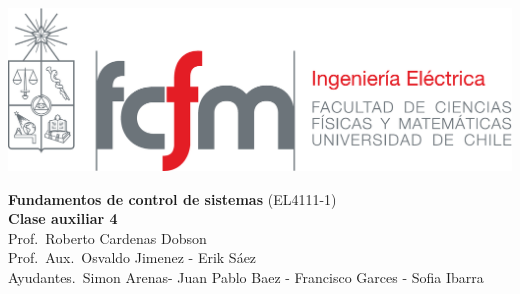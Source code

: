 \documentclass[
  11pt,
  letterpaper,
   addpoints,
   answers
  ]{exam}
\begin{document}
\noindent
\begin{minipage}{0.47\textwidth}
\includegraphics[width=\textwidth]{../fcfm_die}
\end{minipage}
\begin{minipage}{0.53\textwidth}
\begin{center} 
\large\textbf{Fundamentos de control de sistemas} (EL4111-1) \\
\large\textbf{Clase auxiliar 4} \\
\small Prof.~Roberto Cardenas Dobson\\
\small Prof.~Aux.~Osvaldo Jimenez - Erik Sáez\\
\small Ayudantes.~Simon Arenas- Juan Pablo Baez - Francisco Garces - Sofia Ibarra\\
\end{center}
\end{minipage}

\vspace{0.5cm}
\noindent
\vspace{.85cm}
\end{document}

